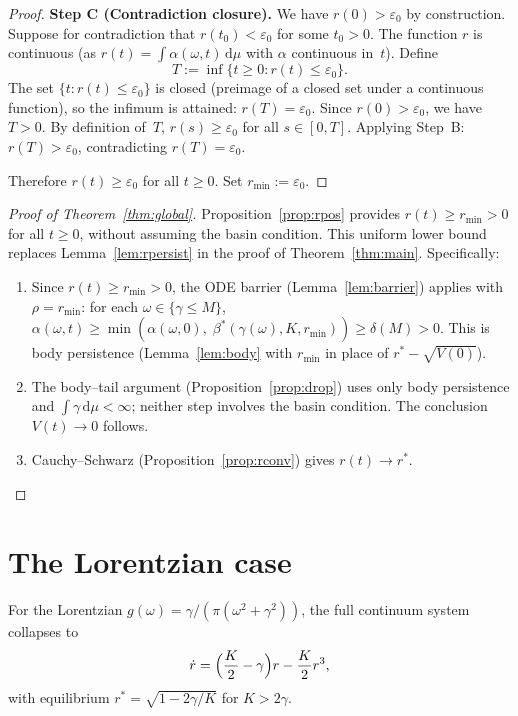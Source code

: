 \documentclass[11pt,a4paper]{article}
\theoremstyle{definition}
\begin{document}
\begin{proof}
\textbf{Step C (Contradiction closure).}
We have $r(0)>\varepsilon_0$ by construction. Suppose for contradiction that $r(t_0)<\varepsilon_0$ for some $t_0>0$. The function $r$ is continuous (as $r(t)=\int\alpha(\omega,t)\,\mathrm{d}\mu$ with $\alpha$ continuous in~$t$). Define
\[
T := \inf\{t\geq 0 : r(t)\leq\varepsilon_0\}.
\]
The set $\{t:r(t)\leq\varepsilon_0\}$ is closed (preimage of a closed set under a continuous function), so the infimum is attained: $r(T)=\varepsilon_0$. Since $r(0)>\varepsilon_0$, we have $T>0$. By definition of~$T$, $r(s)\geq\varepsilon_0$ for all $s\in[0,T]$. Applying Step~B: $r(T)>\varepsilon_0$, contradicting $r(T)=\varepsilon_0$.

Therefore $r(t)\geq\varepsilon_0$ for all $t\geq 0$. Set $r_{\min}:=\varepsilon_0$.
\end{proof}

\begin{proof}[Proof of Theorem~\ref{thm:global}]
Proposition~\ref{prop:rpos} provides $r(t)\geq r_{\min}>0$ for all $t\geq 0$, without assuming the basin condition. This uniform lower bound replaces Lemma~\ref{lem:rpersist} in the proof of Theorem~\ref{thm:main}. Specifically:
\begin{enumerate}
\item Since $r(t)\geq r_{\min}>0$, the ODE barrier (Lemma~\ref{lem:barrier}) applies with $\rho=r_{\min}$: for each $\omega\in\{\gamma\leq M\}$, $\alpha(\omega,t)\geq\min(\alpha(\omega,0),\;\beta^*(\gamma(\omega),K,r_{\min}))\geq\delta(M)>0$. This is body persistence (Lemma~\ref{lem:body} with $r_{\min}$ in place of $r^*-\sqrt{V(0)}$).
\item The body--tail argument (Proposition~\ref{prop:drop}) uses only body persistence and $\int\gamma\,\mathrm{d}\mu<\infty$; neither step involves the basin condition. The conclusion $V(t)\to 0$ follows.
\item Cauchy--Schwarz (Proposition~\ref{prop:rconv}) gives $r(t)\to r^*$. \qedhere
\end{enumerate}
\end{proof}

\section{The Lorentzian case}\label{sec:lorentzian}

For the Lorentzian $g(\omega)=\gamma/(\pi(\omega^2+\gamma^2))$, the full continuum system collapses to
\begin{equation}\label{eq:bernoulli}
\dot r = \Bigl(\frac{K}{2}-\gamma\Bigr)r - \frac{K}{2}r^3,
\end{equation}
with equilibrium $r^*=\sqrt{1-2\gamma/K}$ for $K>2\gamma$.
\end{document}
